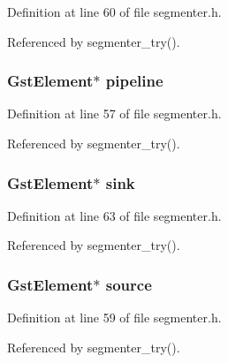 \-Definition at line 60 of file segmenter.\-h.



\-Referenced by segmenter\-\_\-try().

\hypertarget{struct__transcoder__data_a310ff227733a8a01cb68a9af5e132751}{
\subsubsection[{pipeline}]{\setlength{\rightskip}{0pt plus 5cm}\-Gst\-Element$\ast$ {\bf pipeline}}}\label{struct__transcoder__data_a310ff227733a8a01cb68a9af5e132751}


\-Definition at line 57 of file segmenter.\-h.



\-Referenced by segmenter\-\_\-try().

\hypertarget{struct__transcoder__data_a92b8e1a70279c8c57514246bcea2a6c0}{
\subsubsection[{sink}]{\setlength{\rightskip}{0pt plus 5cm}\-Gst\-Element$\ast$ {\bf sink}}}\label{struct__transcoder__data_a92b8e1a70279c8c57514246bcea2a6c0}


\-Definition at line 63 of file segmenter.\-h.



\-Referenced by segmenter\-\_\-try().

\hypertarget{struct__transcoder__data_a258d0be8d8f4992e7579e31c12e06078}{
\subsubsection[{source}]{\setlength{\rightskip}{0pt plus 5cm}\-Gst\-Element$\ast$ {\bf source}}}\label{struct__transcoder__data_a258d0be8d8f4992e7579e31c12e06078}


\-Definition at line 59 of file segmenter.\-h.



\-Referenced by segmenter\-\_\-try().

